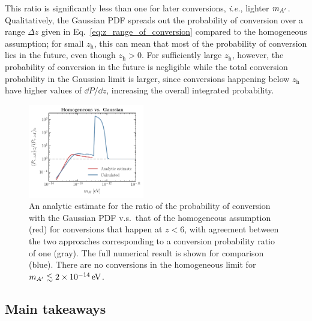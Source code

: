 \documentclass[prd,aps,10pt,nofootinbib,twocolumn,superscriptaddress,preprintnumbers,balancelastpage,longbibliography]{revtex4-1}
\begin{document}
This ratio is significantly less than one for later conversions, \emph{i.e.}, lighter $m_{A^\prime}$.
Qualitatively, the Gaussian PDF spreads out the probability of conversion over a range $\Delta z$ given in Eq.~\eqref{eq:z_range_of_conversion} compared to the homogeneous assumption; for small $z_\text{h}$, this can mean that most of the probability of conversion lies in the future, even though $z_\text{h} > 0$. 
For sufficiently large $z_\text{h}$, however, the probability of conversion in the future is negligible while the total conversion probability in the Gaussian limit is larger, since conversions happening below $z_\text{h}$ have higher values of $\dd P/\dd z$, increasing the overall integrated probability. 

\begin{figure}
    \centering
    \includegraphics[width=0.45\textwidth]{plots/homo_vs_gauss_error}
    \caption{An analytic estimate for the ratio of the probability of conversion with the Gaussian PDF v.s.\ that of the homogeneous assumption (red) for conversions that happen at $z < 6$, with agreement between the two approaches corresponding to a conversion probability ratio of one (gray). The full numerical result is shown for comparison (blue). There are no conversions in the homogeneous limit for $\mAp \lesssim \SI{2e-14}{\eV}$.~}
    \label{fig:homo_vs_gauss_error}
\end{figure}

\subsection{Main takeaways}
\end{document}
